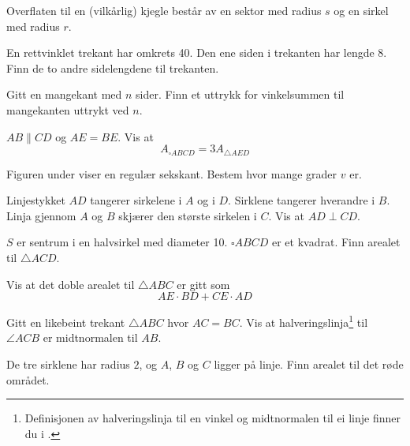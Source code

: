 Overflaten til en (vilkårlig) kjegle består av en sektor med radius $ s $ og en sirkel med radius $ r $.




En rettvinklet trekant har omkrets 40. Den ene siden i trekanten har lengde 8. Finn de to andre sidelengdene til trekanten.

Gitt en mangekant med $ n $ sider. Finn et uttrykk for vinkelsummen til mangekanten uttrykt ved $ n $.

 \vs
{}

$AB\parallel CD$ og $AE=BE$. Vis at
\[ A_{\square ABCD}=3A_{\triangle AED} \]

\newpage
{}
Figuren under viser en regulær sekskant. Bestem hvor mange grader $ v $ er.

Linjestykket $ AD $ tangerer sirkelene i $A$ og i $D$. Sirklene tangerer hverandre i $ B $. Linja gjennom $ A $ og $ B $ skjærer den største sirkelen i $ C $. Vis at $ AD\perp CD $.

$S$ er sentrum i en halvsirkel med diameter 10. $\square ABCD$ er et kvadrat. Finn arealet til $\triangle ACD$.

\newpage
{}
Vis at det doble arealet til $ \triangle ABC $ er gitt som
\[ AE\cdot BD + CE\cdot AD \]

Gitt en likebeint trekant $\triangle {ABC} $ hvor $ AC=BC $. Vis at halveringslinja\footnote{Definisjonen av halveringslinja til en vinkel og midtnormalen til ei linje finner du i \tmen.} til $ \angle ACB $ er midtnormalen til $ AB $.

De tre sirklene har radius $ 2 $, og $ A $, $ B $ og $ C $ ligger på linje.
Finn arealet til det røde området.


